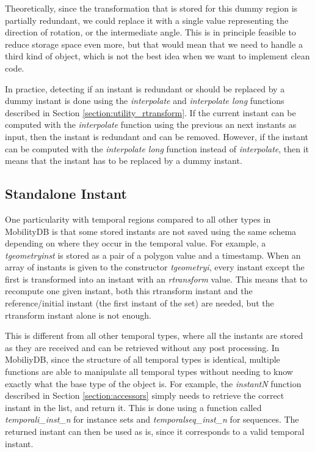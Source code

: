Theoretically, since the transformation that is stored for this dummy region is partially redundant, we could replace it with a single value representing the direction of rotation, or the intermediate angle. This is in principle feasible to reduce storage space even more, but that would mean that we need to handle a third kind of object, which is not the best idea when we want to implement clean code. 

In practice, detecting if an instant is redundant or should be replaced by a dummy instant is done using the \textit{interpolate} and \textit{interpolate long} functions described in Section \ref{section:utility_rtransform}. If the current instant can be computed with the \textit{interpolate} function using the previous an next instants as input, then the instant is redundant and can be removed. However, if the instant can be computed with the \textit{interpolate long} function instead of \textit{interpolate}, then it means that the instant has to be replaced by a dummy instant.

\subsection{Standalone Instant}
\label{section:standalone_inst}

One particularity with temporal regions compared to all other types in MobilityDB is that some stored instants are not saved using the same  schema depending on where they occur in the temporal value. For example, a \textit{tgeometryinst} is stored as a pair of a polygon value and a timestamp. When an array of instants is given to the constructor \textit{tgeometryi}, every instant except the first is transformed into an instant with an \textit{rtransform} value. This means that to recompute one given instant, both this rtransform instant and the reference/initial instant (the first instant of the set) are needed, but the rtransform instant alone is not enough. 

This is different from all other temporal types, where all the instants are stored as they are received and can be retrieved without any post processing. In MobiliyDB, since the structure of all temporal types is identical, multiple functions are able to manipulate all temporal types without needing to know exactly what the base type of the object is. For example, the \textit{instantN} function described in Section \ref{section:accessors} simply needs to retrieve the correct instant in the list, and return it. This is done using a function called \textit{temporali\_inst\_n} for instance sets and \textit{temporalseq\_inst\_n} for sequences. The returned instant can then be used as is, since it corresponds to a valid temporal instant.

